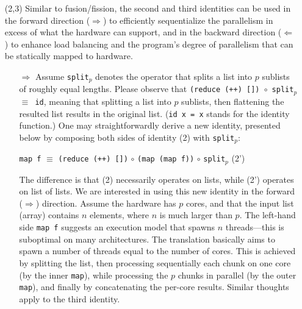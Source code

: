 \documentclass[acmsmall,review]{acmart}\settopmatter{printfolios=true,printccs=false,printacmref=false}
\begin{document}
\begin{itemize}
    \item[(2,3)] Similar to fusion/fission, the second and third identities can 
                    be used in the forward 
                    direction ($\Rightarrow$) to efficiently sequentialize 
                    the parallelism in excess of what the hardware can support, 
                    and in the backward direction ($\Leftarrow$)  
                    to enhance load balancing and the program's degree of 
                    parallelism that can be statically mapped to hardware.
        \begin{itemize}
            \item[$\Rightarrow$]
                    Assume {\tt split$_p$} denotes the operator that splits a 
                    list into $p$ sublists of roughly equal lengths. Please 
                    observe that {\tt (reduce (++) []) $\circ$ split$_p$ $\equiv$ id},
                    meaning that splitting a list into $p$ sublists, then
                    flattening the resulted list results in the original list.
                    ({\tt id x = x} stands for the identity function.)
                    One may straightforwardly derive a new identity, presented
                    below by composing both sides of identity (2) with {\tt split$_p$}:
                    \begin{center}\lstinline{map f} $\equiv$ \lstinline{(reduce (++) [])} $\circ$ \lstinline{(map (map f))} $\circ$ {\tt split$_p$} (2')\end{center}
                    The difference is that (2) necessarily operates on lists, while 
                    (2') operates on list of lists.   We are interested in using 
                    this new identity in the forward ($\Rightarrow$) direction. 
                    Assume the hardware
                    has $p$ cores, and that the input list (array) contains
                    $n$ elements, where $n$ is much larger than $p$. The left-hand side 
                    \lstinline{map f} suggests an execution model that spawns $n$
                    threads---this is suboptimal on many architectures.
                    The translation basically aims to spawn a number of threads
                    equal to the number of cores. This is achieved by splitting
                    the list, then processing sequentially each chunk on one core
                    (by the inner \lstinline{map}), while processing the $p$ chunks 
                    in parallel (by the outer \lstinline{map}), and finally by
                    concatenating the per-core results. Similar thoughts apply to
                    the third identity.   
                    

\end{itemize}
\end{itemize}
\end{document}
